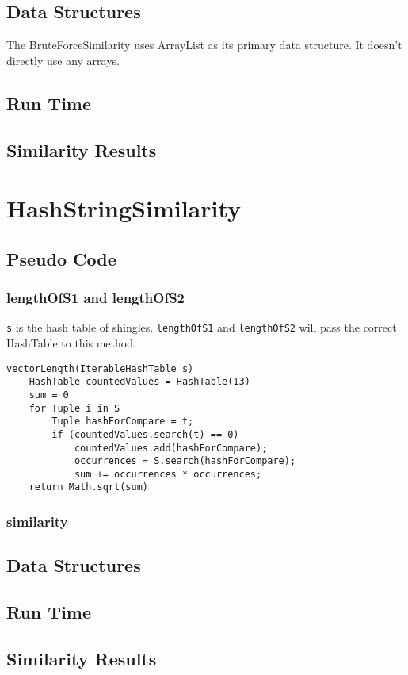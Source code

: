 \documentclass[10pt,letterpaper]{article}
\begin{document}
\subsection{Data Structures}
The BruteForceSimilarity uses ArrayList as its primary data structure. It doesn't directly use any arrays. 
\subsection{Run Time}
\subsection{Similarity Results}
\section{HashStringSimilarity}
\subsection{Pseudo Code}
\subsubsection{lengthOfS1 and lengthOfS2}
\texttt{s} is the hash table of shingles. \texttt{lengthOfS1} and \texttt{lengthOfS2} will pass the correct HashTable to this method.
\begin{verbatim}
vectorLength(IterableHashTable s)
    HashTable countedValues = HashTable(13)
    sum = 0
    for Tuple i in S
        Tuple hashForCompare = t;
        if (countedValues.search(t) == 0)
            countedValues.add(hashForCompare);
            occurrences = S.search(hashForCompare);
            sum += occurrences * occurrences;
    return Math.sqrt(sum)
\end{verbatim}
\subsubsection{similarity}
\subsection{Data Structures }
\subsection{Run Time}
\subsection{Similarity Results}
\end{document}

